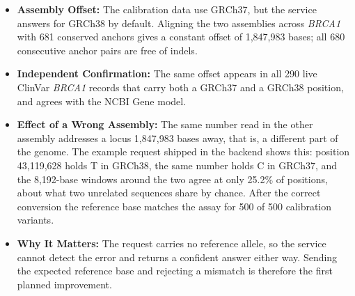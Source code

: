 \begin{itemize}
\item \textbf{Assembly Offset:} The calibration data use GRCh37, but the service answers for GRCh38 by default. Aligning the two assemblies across \textit{BRCA1} with 681 conserved anchors gives a constant offset of 1,847,983 bases; all 680 consecutive anchor pairs are free of indels.
\item \textbf{Independent Confirmation:} The same offset appears in all 290 live ClinVar \textit{BRCA1} records that carry both a GRCh37 and a GRCh38 position, and agrees with the NCBI Gene model.
\item \textbf{Effect of a Wrong Assembly:} The same number read in the other assembly addresses a locus 1,847,983 bases away, that is, a different part of the genome. The example request shipped in the backend shows this: position 43,119,628 holds T in GRCh38, the same number holds C in GRCh37, and the 8,192-base windows around the two agree at only 25.2\% of positions, about what two unrelated sequences share by chance. After the correct conversion the reference base matches the assay for 500 of 500 calibration variants.
\item \textbf{Why It Matters:} The request carries no reference allele, so the service cannot detect the error and returns a confident answer either way. Sending the expected reference base and rejecting a mismatch is therefore the first planned improvement.
\end{itemize}

